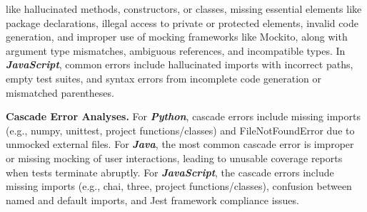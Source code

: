 like hallucinated methods, constructors, or classes, missing essential elements like package declarations, illegal access to private or protected elements, invalid code generation, and improper use of mocking frameworks like Mockito, along with argument type mismatches, ambiguous references, and incompatible types.
In \textbf{\textit{JavaScript}}, common errors include hallucinated imports with incorrect paths, empty test suites, and syntax errors from incomplete code generation or mismatched parentheses.

\noindent\textbf{Cascade Error Analyses. }
For \textbf{\textit{Python}}, 
cascade errors include missing imports (e.g., numpy, unittest, project functions/classes) and FileNotFoundError due to unmocked external files.
For \textbf{\textit{Java}}, the most common cascade error 
is improper or missing mocking of user interactions, leading to unusable coverage reports when tests terminate abruptly.
For \textbf{\textit{JavaScript}}, the cascade errors include 
missing imports (e.g., chai, three, project functions/classes), confusion between named and default imports, and Jest framework compliance issues.


